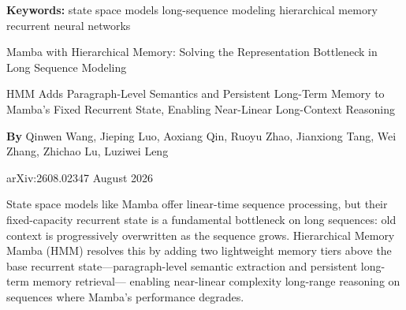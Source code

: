 \documentclass[10pt,twocolumn]{article}
\begin{document}
\setlength{\parindent}{0pt}
\setlength{\parskip}{4pt}

{\small\color{keywordgray}\textbf{Keywords:}
  state space models \textbullet{}
  long-sequence modeling \textbullet{}
  hierarchical memory \textbullet{}
  recurrent neural networks}\par\vspace{4pt}

{\LARGE\bfseries\raggedright
  Mamba with Hierarchical Memory: Solving the
  Representation Bottleneck in Long Sequence Modeling}\par\vspace{4pt}

{\large\itshape\raggedright
  HMM Adds Paragraph-Level Semantics and Persistent Long-Term Memory
  to Mamba's Fixed Recurrent State, Enabling Near-Linear Long-Context
  Reasoning}\par\vspace{6pt}

{\small\textbf{By} Qinwen Wang, Jieping Luo, Aoxiang Qin, Ruoyu Zhao,
  Jianxiong Tang, Wei Zhang, Zhichao Lu,
  Luziwei Leng}\par\vspace{2pt}

{\small\color{keywordgray}arXiv:2608.02347 \textbullet{} August 2026}
\par\vspace{2pt}\noindent{\color{rulered}\rule{\columnwidth}{0.6pt}}\vspace{6pt}

State space models like Mamba offer linear-time sequence processing, but their
fixed-capacity recurrent state is a fundamental bottleneck on long sequences: old
context is progressively overwritten as the sequence grows. Hierarchical Memory Mamba
(HMM) resolves this by adding two lightweight memory tiers above the base recurrent
state---paragraph-level semantic extraction and persistent long-term memory retrieval---
enabling near-linear complexity long-range reasoning on sequences where Mamba's
performance degrades.
\end{document}
